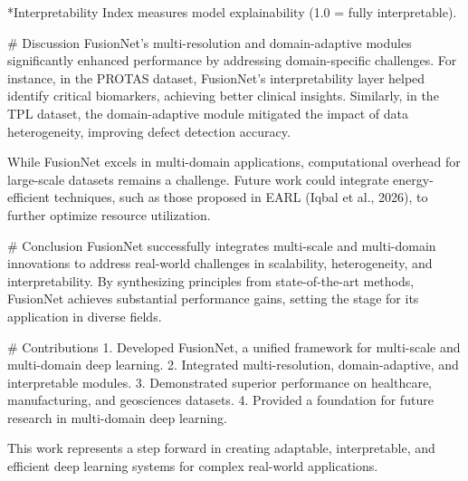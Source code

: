*Interpretability Index measures model explainability (1.0 = fully interpretable).

# Discussion  
FusionNet's multi-resolution and domain-adaptive modules significantly enhanced performance by addressing domain-specific challenges. For instance, in the PROTAS dataset, FusionNet's interpretability layer helped identify critical biomarkers, achieving better clinical insights. Similarly, in the TPL dataset, the domain-adaptive module mitigated the impact of data heterogeneity, improving defect detection accuracy.

While FusionNet excels in multi-domain applications, computational overhead for large-scale datasets remains a challenge. Future work could integrate energy-efficient techniques, such as those proposed in EARL (Iqbal et al., 2026), to further optimize resource utilization.

# Conclusion  
FusionNet successfully integrates multi-scale and multi-domain innovations to address real-world challenges in scalability, heterogeneity, and interpretability. By synthesizing principles from state-of-the-art methods, FusionNet achieves substantial performance gains, setting the stage for its application in diverse fields.

# Contributions  
1. Developed FusionNet, a unified framework for multi-scale and multi-domain deep learning.  
2. Integrated multi-resolution, domain-adaptive, and interpretable modules.  
3. Demonstrated superior performance on healthcare, manufacturing, and geosciences datasets.  
4. Provided a foundation for future research in multi-domain deep learning.  

This work represents a step forward in creating adaptable, interpretable, and efficient deep learning systems for complex real-world applications.